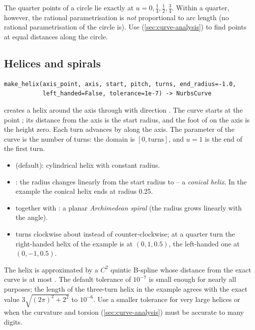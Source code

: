 \begin{note}
The quarter points of a circle lie exactly at $u = 0, \tfrac14, \tfrac12, \tfrac34$. Within a
quarter, however, the rational parametrisation is \emph{not} proportional to arc length (no
rational parametrisation of the circle is). Use 
(\cref{sec:curve-analysis}) to find points at equal distances along the circle.
\end{note}

\subsection{Helices and spirals}\label{sec:helix}

\begin{lstlisting}[style=text]
make_helix(axis_point, axis, start, pitch, turns, end_radius=-1.0,
           left_handed=False, tolerance=1e-7) -> NurbsCurve
\end{lstlisting}

 creates a helix around the axis through  with direction
. The curve starts at the point ; its distance from the axis is the start
radius, and the foot of  on the axis is the height zero. Each turn advances by
 along the axis. The parameter of the curve is the number of turns: the domain is
$[0, \text{turns}]$, and $u = 1$ is the end of the first turn.

\begin{itemize}
\item {} (default): cylindrical helix with constant radius.
\item {}: the radius changes linearly from the start radius to
   -- a \emph{conical helix}. In the example the conical helix ends at radius
  0.25.
\item {} together with : a planar \emph{Archimedean spiral} (the
  radius grows linearly with the angle).
\item {} turns clockwise about  instead of counter-clockwise; at
  a quarter turn the right-handed helix of the example is at $(0, 1, 0.5)$, the left-handed one
  at $(0, -1, 0.5)$.
\end{itemize}

The helix is approximated by a $C^2$ quintic B-spline whose distance from the exact curve is at
most . The default tolerance of $10^{-7}$ is small enough for nearly all
purposes; the length of the three-turn helix in the example agrees with the exact value
$3\sqrt{(2\pi)^2+2^2}$ to $10^{-6}$. Use a smaller tolerance for very large helices or when the
curvature and torsion (\cref{sec:curve-analysis}) must be accurate to many digits.

